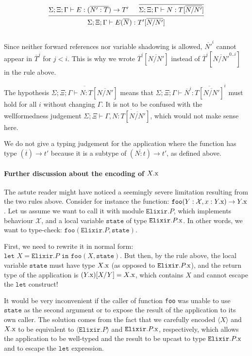 \documentclass[12pt]{article}
\newcommand{\tx}{\text{\rm x}}
\newcommand{\BX}{\ensuremath{\mathcal{X}}}
\newcommand{\Gammatop}{\ensuremath{\Xi}}
\newcommand{\Gammabot}{\ensuremath{\Gamma}}
\newcommand{\Elixir}{\texttt{Elixir}}
\begin{document}
\[
    \begin{prooftree}
        \hypo { \Sigma; \Gammatop; \Gammabot \vdash E : (\overline{N' : T}) \rightarrow T'}
        \hypo { \overline{\Sigma; \Gammatop; \Gammabot \vdash N : T[\overline{N/N'}]} }
        \infer2{ \Sigma; \Gammatop; \Gammabot \vdash E(\overline{N}) : T'[\overline{N/N'}] }
    \end{prooftree}
\] \\

Since neither forward references nor variable shadowing is allowed, $\overline{N'}^i$
cannot appear in $\overline{T}^j$ for $j < i$.
This is why we wrote $\overline{T}^i[\overline{N/N'}]$ instead of $\overline{T}^i[\overline{N/N'}^{0..i}]$
in the rule above.

The hypothesis $\overline{\Sigma; \Gammatop; \Gammabot \vdash N : T[\overline{N/N'}]}$ means that
$\Sigma; \Gammatop; \Gammabot \vdash \overline{N}^i : \overline{T[\overline{N/N'}]}^i$ must hold for all $i$
without changing $\Gammabot$. It is not to be confused with the wellformedness judgement
$\Sigma; \Gammatop \vdash \Gammabot, \overline{N : T[\overline{N/N'}]}$, which would not make sense here.

We do not give a typing judgement for the application where the function has type $(\overline{t}) \rightarrow t'$
because it is a subtype of $(\overline{N : t}) \rightarrow t'$, as defined above.

\paragraph{Further discussion about the encoding of $X.\tx$} The astute reader might have noticed a seemingly severe limitation resulting from the two rules above.
Consider for instance the function: $\texttt{foo}(Y : \BX, x : Y.\tx) \rightarrow Y.\tx$.
Let us assume we want to call it with module $\Elixir.P$, which implements behaviour $\BX$,
and a local variable $\texttt{state}$ of type $\Elixir.P.\tx$. In other words, we want to type-check:
$\texttt{foo}(\Elixir.P, \texttt{state})$.

First, we need to rewrite it in normal form:
$\texttt{let } X = \Elixir.P \texttt{ in } \texttt{foo}(X, \texttt{state})$.
But then, by the rule above, the local variable $\texttt{state}$ must have type $X.\tx$ (as opposed to $\Elixir.P.\tx$),
and the return type of the application is $(Y.\tx)[X/Y] = X.\tx$, which
contains $X$ and cannot escape the $\texttt{let}$ construct!

It would be very inconvenient if the caller of function \texttt{foo} was unable
to use $\texttt{state}$ as the second argument or to expose the result of the application to its own caller.
The solution comes from the fact that we carefully encoded $\langle X \rangle$ and $X.\tx$
to be equivalent to $\langle \Elixir.P \rangle$ and $\Elixir.P.\tx$, respectively, which allows the application
to be well-typed and the result to be upcast to type $\Elixir.P.\tx$ and to escape the $\texttt{let}$ expression.
\end{document}

